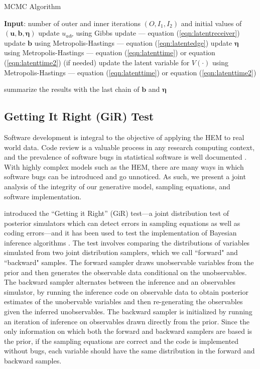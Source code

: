 \documentclass[ba]{imsart}
\def\spacingset#1{\renewcommand{\baselinestretch}%
	{#1}\small\normalsize} \spacingset{1}
\numberwithin{equation}{section}
\theoremstyle{plain}
\begin{document}
\begin{algorithm}[!t]
	\spacingset{1}
	\SetAlgoLined
	\caption{MCMC Algorithm}
	\begin{algorithmic}
	\STATE \textbf{Input}: number of outer and inner iterations $(O, I_1, I_2)$ and initial values of $(\boldsymbol{u}, \boldsymbol{b}, \boldsymbol{\eta})$
				\vskip 0.1in
					\STATE update $u_{adr}$ using Gibbs update --- equation (\ref{eqn:latentreceiver})
			\ENDFOR
		\ENDFOR
		\ENDFOR
			\STATE update $\boldsymbol{b}$ using Metropolis-Hastings --- equation (\ref{eqn:latentedge})
		\ENDFOR
			\STATE update $\boldsymbol{\eta}$ using Metropolis-Hastings --- equation (\ref{eqn:latenttime}) or equation (\ref{eqn:latenttime2}) 
			\STATE (if needed) update the latent variable for $V(\cdot)$ using Metropolis-Hastings --- equation (\ref{eqn:latenttime}) or equation (\ref{eqn:latenttime2}) 
		\ENDFOR

	\ENDFOR
	\STATE	summarize the results with the last chain of $\boldsymbol{b}$ and $\boldsymbol{\eta}$
\end{algorithmic}
\label{alg:MCMC}
\end{algorithm}
\subsection{Getting It Right (GiR) Test} \label{subec:GiR}
  Software development is integral to the objective of applying the HEM to real world data. Code review is a valuable process in any research computing context, and the prevalence of software bugs in statistical software is well documented \citep[e.g., ][]{altman2004numerical,mccullough2009accuracy}.  With highly complex models such as the HEM, there are many ways in which software bugs can be introduced and go unnoticed. As such, we present a joint analysis of the integrity of our generative model, sampling equations, and software implementation. 
  
   \cite{geweke2004getting} introduced the ``Getting it Right'' (GiR) test---a joint distribution test of posterior simulators which can detect errors in sampling equations as well as coding errors---and it has been used to test the implementation of Bayesian inference algorithms \citep{zhao2016bayesian}.  The test involves comparing the distributions of variables simulated from two joint distribution samplers, which we call ``forward" and ``backward" samples. The forward sampler draws unobservable variables from the prior and then generates the observable data conditional on the unobservables. The backward sampler alternates between the inference and an observables simulator, by running the inference code on observable data to obtain posterior estimates of the unobervable variables and then re-generating the observables given the inferred unobservables. The backward sampler is initialized by running an iteration of inference on observables drawn directly from the prior. Since the only information on which both the forward and backward samplers are based is the prior, if the sampling equations are correct and the code is implemented without bugs, each variable should have the same distribution in the forward and backward samples.
   
\end{document}
